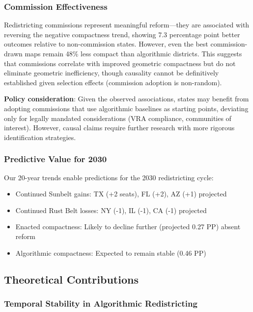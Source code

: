 \subsubsection{Commission Effectiveness}

Redistricting commissions represent meaningful reform—they are associated with reversing the negative compactness trend, showing 7.3 percentage point better outcomes relative to non-commission states. However, even the best commission-drawn maps remain 48\% less compact than algorithmic districts. This suggests that commissions correlate with improved geometric compactness but do not eliminate geometric inefficiency, though causality cannot be definitively established given selection effects (commission adoption is non-random).

\textbf{Policy consideration}: Given the observed associations, states may benefit from adopting commissions that use algorithmic baselines as starting points, deviating only for legally mandated considerations (VRA compliance, communities of interest). However, causal claims require further research with more rigorous identification strategies.

\subsubsection{Predictive Value for 2030}

Our 20-year trends enable predictions for the 2030 redistricting cycle:
\begin{itemize}
    \item Continued Sunbelt gains: TX (+2 seats), FL (+2), AZ (+1) projected
    \item Continued Rust Belt losses: NY (-1), IL (-1), CA (-1) projected
    \item Enacted compactness: Likely to decline further (projected 0.27 PP) absent reform
    \item Algorithmic compactness: Expected to remain stable (0.46 PP)
\end{itemize}

\subsection{Theoretical Contributions}

\subsubsection{Temporal Stability in Algorithmic Redistricting}

